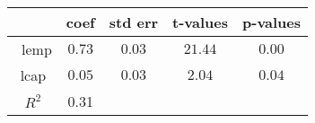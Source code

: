 \begin{table}[H]
\centering
\begin{tabular}{c | cccc}
 & \textbf{coef} & \textbf{std err} & \textbf{t-values} & \textbf{p-values} \\
\toprule \
lemp       &  $0.73$ & $0.03$ & $21.44$ & $0.00$  \\
lcap       &  $0.05$ & $0.03$ & $2.04$ & $0.04$  \\
\midrule 
$R^2$ & 0.31 && \\
\bottomrule
\end{tabular}
\caption{}
\label{}
\end{table}